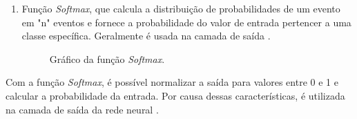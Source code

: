 \begin{enumerate}
	\item Função \textit{Softmax}, que calcula a distribuição de probabilidades de um evento em "n" eventos e fornece a probabilidade do valor de entrada pertencer a uma classe específica. Geralmente é usada na camada de saída \cite{gharat2019what}.
	\begin{figure}[ht]
	\caption{Gráfico da função \textit{Softmax}.}
	\begin{center}
	\end{center}
	\label{fig:grafico_softmax}
	\end{figure}
\end{enumerate}

Com a função \textit{Softmax}, é possível normalizar a saída para valores entre 0 e 1 e calcular a probabilidade da entrada. Por causa dessas características, é utilizada na camada de saída da rede neural \cite{gharat2019what}.
